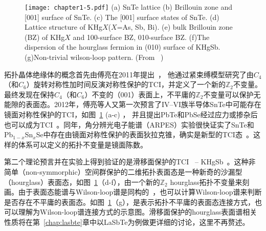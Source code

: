 \begin{figure}[!htbp]
    \centering
    \texttt{[image: chapter1-5.pdf]}
    {(a) SnTe lattice (b) Brillouin zone and [001] surface of SnTe.
    (c) The [001] surface states of SnTe.
    (d) Lattice structure of KHg$X$($X$=As, Sb, Bi).
    (e) bulk Brillouin zone (BZ) of KHg$X$ and 100-surface BZ, 010-surface BZ.
    (f)The dispersion of the hourglass fermion in (010) surface of KHgSb.
    (g)Non-trivial wilson-loop pattern. (From ~\citep{hsieh2012topological, wang2016hourglass})}
    \label{fig:1-5}
\end{figure}
拓扑晶体绝缘体的概念首先由傅亮在2011年提出~\citep{fu2011topological}，
他通过紧束缚模型研究了由$C_4$（和$C_6$）旋转对称性加时间反演对称性保护的TCI，并定义了一个新的$\mathbb{Z}_2$不变量。最终发现在保持$C_4$（和$C_6$）不变的（001）表面上，不平庸的$\mathbb{Z}_2$不变量可以保护无能隙的表面态。2012年，傅亮等人又第一次预言了IV–VI族半导体SnTe中可能存在镜面对称性保护的TCI，如图~\ref{fig:1-5} (a-c) ， 并且提出PbTe和PbSe经过应力或掺杂后也可以成为TCI~\citep{hsieh2012topological}。同年，角分辨光电子能谱（ARPES）实验很快证实了SnTe和Pb$_{1-x}$Sn$_x$Se中存在由镜面对称性保护的表面狄拉克锥，确实是新型的TCI态~\citep{tanaka2012experimental,Dziawa2012}。这样的体系可以定义的拓扑不变量是镜面陈数。

第二个理论预言并在实验上得到验证的是滑移面保护的TCI~\citep{liucx2014,Fang2015new, Shiozaki} -- KHgSb~\citep{wang2016hourglass,ma2017experimental}。这种非简单（non-symmorphic）空间群保护的二维拓扑表面态是一种新奇的沙漏型（hourglass）表面态，如图~\ref{fig:1-5}（d-f），由一个新的$\mathbb{Z}_2$ hourglass拓扑不变量来刻画。由于表面态能谱与Wilson-loop谱是同构的~\citep{fidkowski2011model}，也可以计算Wilson-loop谱来判断是否存在不平庸的表面态。如图~\ref{fig:1-5}（g），是表示拓扑不平庸的表面态连接方式，也可以理解为Wilson-loop谱连接方式的示意图。滑移面保护的hourglass表面谱相关性质将在第~\ref{chap:lasbte}章中以LaSbTe为例做更详细的讨论，这里不再赘述。

